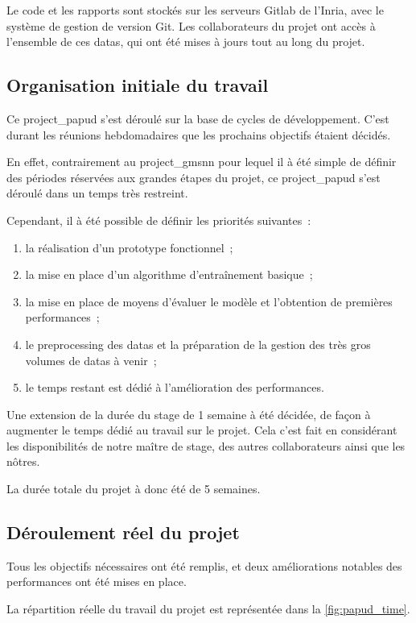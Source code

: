 Le code et les rapports sont stockés sur les serveurs Gitlab de l'Inria, avec le système de gestion de version Git. Les collaborateurs du projet ont accès à l'ensemble de ces \glspl{data}, qui ont été mises à jours tout au long du projet.

\subsection{Organisation initiale du travail}
Ce \gls{project_papud} s'est déroulé sur la base de cycles de développement.
C'est durant les réunions hebdomadaires que les prochains objectifs étaient décidés.

En effet, contrairement au \gls{project_gmsnn} pour lequel il à été simple de définir des périodes réservées aux grandes étapes du projet, ce \gls{project_papud} s'est déroulé dans un temps très restreint.

Cependant, il à été possible de définir les priorités suivantes~:
\begin{enumerate}
	\item la réalisation d'un prototype fonctionnel~;
	\item la mise en place d'un algorithme d'entraînement basique~;
	\item la mise en place de moyens d'évaluer le modèle et l'obtention de premières performances~;
	\item le \gls{preprocessing} des \glspl{data} et la préparation de la gestion des très gros volumes de \glspl{data} à venir~;
	\item le temps restant est dédié à l'amélioration des performances.
\end{enumerate}
\hspace{1em}

Une extension de la durée du stage de 1 semaine à été décidée, de façon à augmenter le temps dédié au travail sur le projet.
Cela c'est fait en considérant les disponibilités de notre maître de stage, des autres collaborateurs ainsi que les nôtres.

La durée totale du projet à donc été de 5 semaines.

\subsection{Déroulement réel du projet}
Tous les objectifs nécessaires ont été remplis, et deux améliorations notables des performances ont été mises en place.

La répartition réelle du travail du projet est représentée dans la \autoref{fig:papud_time}.

